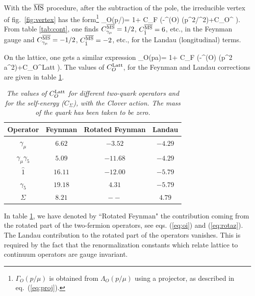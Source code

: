 With the $\overline{{\rm MS}}$ procedure, after the subtraction of the pole,
the
irreducible vertex of fig.\ \ref{fig:vertex} has the form\footnote{$
\Gamma_O(p/\mu)$ is obtained from $\Lambda_O(p/\mu)$ using a projector, as
described in eq.\ (\ref{eq:proj}).}
 \beq \Gamma_O(p/\mu)=
  1+ C_F
\Bigl(-\gamma^{(O)} \ln (p^2/\mu^2)+C_O^{}
 \Bigr). \label{eq:gms}\eeq
{}From table \ref{tab:cont},  one  finds $C_{\gamma_\mu}^{\overline{{\rm
MS}}} =1/2$, $C_{\hat 1}^{\overline{{\rm MS}}}
 =6$, etc., in the Feynman gauge and
$C_{\gamma_\mu}^{\overline{{\rm MS}}} =-1/2$, $C_{\hat 1}^{\overline{{\rm MS}}}
 =-2$, etc., for the Landau (longitudinal) terms.

On the lattice, one gets a
similar expression \beq \Gamma_O(pa)=
  1+ C_F
\Bigl(-\gamma^{(O)} \ln (p^2 a^2)+C_O^{{\rm Latt}}
 \Bigr). \label{eq:gl}\eeq
The values of $C_O^{{\rm Latt}}$, for the Feynman and Landau  corrections are
given in  table \ref{tab:latt}.
\begin{table}[htbp]
\begin{center}
\begin{tabular}{||c|c|c|c||}
%
\hline
%
\textrm{Operator}
&Feynman&Rotated Feynman&Landau   \\ \hline \hline
%
%
$\gamma_\mu$ &$6.62$ &$-3.52$ &$-4.29$ \\
\hline
$\gamma_\mu\gamma_5$&$5.09$ &
$-11.68$ &$-4.29$ \\ \hline
%
$\hat 1$ &$16.11$&$-12.00$&$-5.79$ \\ \hline
$\gamma_5$  &$19.18$ &$4.31$ &$-5.79$\\ \hline
%
$\Sigma$  &$8.21$ &$--$&$4.79$ \\  \hline
\end{tabular}
\caption[]{ \itshape The values of $C_O^{{\rm Latt}}$
 for different two-quark operators and for the self-energy
($C_\Sigma$), with the Clover
action. The mass of the quark has been taken to be
zero.}
\label{tab:latt}
\end{center}
\end{table}

In table \ref{tab:latt}, we have denoted by ``Rotated Feynman" the contribution
coming from the rotated part of the two-fermion operators, see eqs.
(\ref{eq:oi}) and (\ref{eq:rotaz}). The Landau contribution to the
rotated part of the operators vanishes. This is required by  the fact that the
renormalization constants which relate lattice to continuum operators are
gauge invariant.

